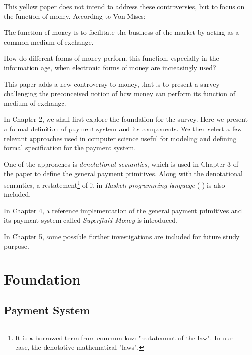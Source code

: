 This yellow paper does not intend to address these controversies, but to focus on the function of money. According to
Von Mises:

\begin{displayquote}
The function of money is to facilitate the business of the market by acting as a common medium of
exchange. 
\end{displayquote}

How do different forms of money perform this function, especially in the information age, when electronic forms of money
are increasingly used?

This paper adds a new controversy to money, that is to present a survey challenging the preconceived notion of how money
can perform its function of medium of exchange.

In Chapter 2, we shall first explore the foundation for the survey. Here we present a formal definition of payment
system and its components. We then select a few relevant approaches used in computer science useful for modeling and
defining formal specification for the payment system.

One of the approaches is \textit{denotational semantics}, which is used in Chapter 3 of the paper to define the general
payment primitives. Along with the denotational semantics, a restatement\footnote{It is a borrowed term from common law:
"restatement of the law". In our case, the denotative mathematical "laws".} of it in \textit{Haskell programming
    language} (\cite{hudak1992report} \cite{jones2003haskell} \cite{marlow2010haskell}) is also included.

In Chapter 4, a reference implementation of the general payment primitives and its payment system called
\textit{Superfluid Money} is introduced.

In Chapter 5, some possible further investigations are included for future study purpose.

\chapter{Foundation}

\section{Payment System}

